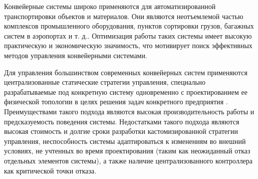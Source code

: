 \documentclass[specification,annotation,times]{itmo-student-thesis}
\theoremstyle{definition}
\begin{document}

\researchpublications{
\begin{refsection}
\nocite{mukhutdinov2019multi}
\nocite{mukhutdinov2019kmu}
\printannobibliography
\end{refsection}
}


\tableofcontents

\startprefacepage

Конвейерные системы широко применяются для автоматизированной транспортировки
объектов и материалов. Они являются неотъемлемой частью комплексов промышленного
оборудования, пунктов сортировки грузов, багажных систем в аэропортах и т. д..
Оптимизация работы таких системы имеет высокую практическую и экономическую
значимость, что мотивирует поиск эффективных методов управления конвейерными
системами.

Для управления большинством современных конвейерных систем применяются
централизованные статические стратегии управления, специально разрабатываемые
под конкретную систему одновременно с проектированием ее физической топологии в
целях решения задач конкретного предприятия \cite{de1994baggage}. Преимуществами
такого подхода являются высокая производительность работы и предсказуемость
поведения системы. Недостатками такого подхода являются высокая стоимость и
долгие сроки разработки кастомизированной стратегии управления, неспособность
системы адаптироваться к изменениям во внешний условиях, не учтенных во время
проектирования (таким как неожиданный отказ отдельных элементов системы), а
также наличие централизованного контроллера как критической точки отказа.
\end{document}
